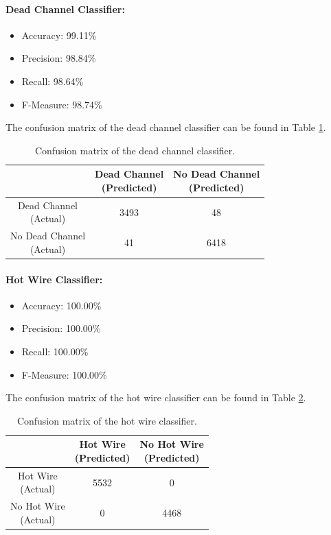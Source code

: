 \paragraph{Dead Channel Classifier:}
\begin{itemize}
  \item Accuracy: 99.11\%
  \item Precision: 98.84\%
  \item Recall: 98.64\%
  \item F-Measure: 98.74\%
\end{itemize}
The confusion matrix of the dead channel classifier can be found in Table
\ref{tbl:confusion-channel}.
\begin{table}[h]
  \centering
  \renewcommand\theadfont{\bfseries}
  \begin{tabular}{|c|c|c|}
    \hline
    & \thead{Dead Channel\\(Predicted)} & \thead{No Dead Channel\\(Predicted)} \\
    \hline
    \thead{Dead Channel\\(Actual)} & 3493 & 48\\
    \hline
    \thead{No Dead Channel\\(Actual)} & 41 & 6418\\
    \hline
  \end{tabular}
  \caption{Confusion matrix of the dead channel classifier.}
  \label{tbl:confusion-channel}
\end{table}

\paragraph{Hot Wire Classifier:}
\begin{itemize}
  \item Accuracy: 100.00\%
  \item Precision: 100.00\%
  \item Recall: 100.00\%
  \item F-Measure: 100.00\%
\end{itemize}
The confusion matrix of the hot wire classifier can be found in Table
\ref{tbl:confusion-hotwire}.
\begin{table}[h]
  \centering
  \renewcommand\theadfont{\bfseries}
  \begin{tabular}{|c|c|c|}
    \hline
    & \thead{Hot Wire\\(Predicted)} & \thead{No Hot Wire\\(Predicted)} \\
    \hline
    \thead{Hot Wire\\(Actual)} & 5532 & 0\\
    \hline
    \thead{No Hot Wire\\(Actual)} & 0 & 4468\\
    \hline
  \end{tabular}
  \caption{Confusion matrix of the hot wire classifier.}
  \label{tbl:confusion-hotwire}
\end{table}

